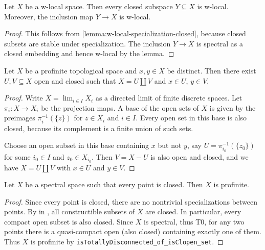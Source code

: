 \begin{lemma}
    \label{thm:closed-subspace-w-local}
    Let \(X\) be a w-local space. Then every closed subspace \(Y \subseteq X\) is w-local.
    Moreover, the inclusion map \(Y \to X\) is w-local.
    \leanok
\end{lemma}

\begin{proof}
    This follows from \ref{lemma:w-local-specialization-closed}, because
    closed subsets are stable under specialization. The inclusion $Y \to X$ is
    spectral as a closed embedding and hence w-local by the lemma.
\end{proof}

\begin{lemma}
    Let $X$ be a profinite topological space and $x, y \in X$ be distinct. Then
    there exist $U, V \subseteq X$ open and closed such that $X = U \coprod V$ and
    $x \in U$, $y \in V$.
    \label{lemma:profinite-disj-clopen-separation}
\end{lemma}

\begin{proof}
  Write $X = \lim_{i \in I} X_i$ as a directed limit of finite discrete spaces. Let $\pi_i \colon X \to X_i$ be the
  projection maps. A base of the open sets of $X$ is given by the preimages $\pi_i^{-1}(\{z\})$ for $z \in X_i$ and $i \in I$. Every open set in this base is also closed, because its complement is a finite union of such sets.

  Choose an open subset in this base containing $x$ but not $y$, say $U = \pi_{i_0}^{-1}(\{z_0\})$ for some $i_0 \in I$ and $z_0 \in X_{i_0}$. Then $V = X - U$ is also open and closed, and we have $X = U \coprod V$ with $x \in U$ and $y \in V$.   
\end{proof}

\begin{lemma}
  Let $X$ be a spectral space such that every point is closed. Then $X$ is profinite.
  \label{lemma:spectral-closed-points-profinite}
\end{lemma}

\begin{proof}
  Since every point is closed, there are no nontrivial specializations between points. By  in , all constructible subsets of $X$ are closed. In particular, every compact open subset is also closed. Since $X$ is spectral, thus T0, for any two points there is a quasi-compact open (also closed) containing exactly one of them. Thus $X$ is profinite by \verb`isTotallyDisconnected_of_isClopen_set`.
\end{proof}


